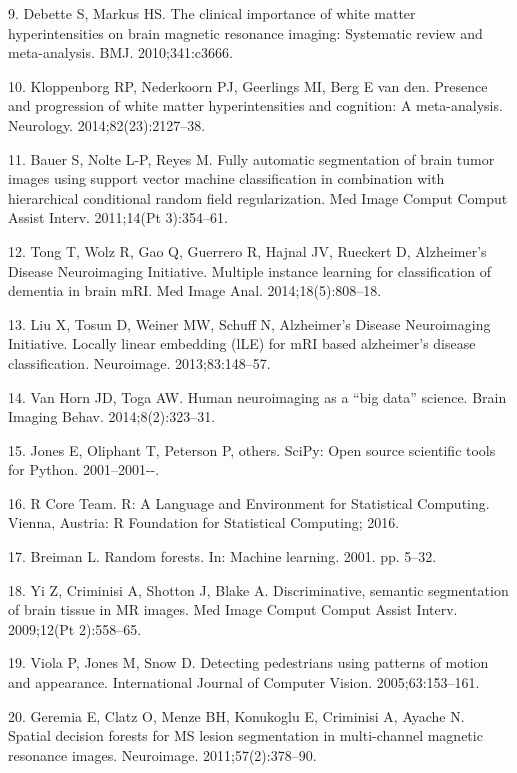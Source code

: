 \documentclass[11pt,]{article}
\begin{document}
\hypertarget{ref-Debette:2010aa}{}
9. Debette S, Markus HS. The clinical importance of white matter
hyperintensities on brain magnetic resonance imaging: Systematic review
and meta-analysis. BMJ. 2010;341:c3666.

\hypertarget{ref-Kloppenborg:2014aa}{}
10. Kloppenborg RP, Nederkoorn PJ, Geerlings MI, Berg E van den.
Presence and progression of white matter hyperintensities and cognition:
A meta-analysis. Neurology. 2014;82(23):2127--38.

\hypertarget{ref-Bauer:2011aa}{}
11. Bauer S, Nolte L-P, Reyes M. Fully automatic segmentation of brain
tumor images using support vector machine classification in combination
with hierarchical conditional random field regularization. Med Image
Comput Comput Assist Interv. 2011;14(Pt 3):354--61.

\hypertarget{ref-Tong:2014aa}{}
12. Tong T, Wolz R, Gao Q, Guerrero R, Hajnal JV, Rueckert D,
Alzheimer's Disease Neuroimaging Initiative. Multiple instance learning
for classification of dementia in brain mRI. Med Image Anal.
2014;18(5):808--18.

\hypertarget{ref-Liu:2013aa}{}
13. Liu X, Tosun D, Weiner MW, Schuff N, Alzheimer's Disease
Neuroimaging Initiative. Locally linear embedding (lLE) for mRI based
alzheimer's disease classification. Neuroimage. 2013;83:148--57.

\hypertarget{ref-Van-Horn:2014aa}{}
14. Van Horn JD, Toga AW. Human neuroimaging as a ``big data'' science.
Brain Imaging Behav. 2014;8(2):323--31.

\hypertarget{ref-scipy}{}
15. Jones E, Oliphant T, Peterson P, others. SciPy: Open source
scientific tools for Python. 2001--2001-\/-.

\hypertarget{ref-R}{}
16. R Core Team. R: A Language and Environment for Statistical
Computing. Vienna, Austria: R Foundation for Statistical Computing;
2016.

\hypertarget{ref-breiman2001}{}
17. Breiman L. Random forests. In: Machine learning. 2001. pp. 5--32.

\hypertarget{ref-yi2009}{}
18. Yi Z, Criminisi A, Shotton J, Blake A. Discriminative, semantic
segmentation of brain tissue in MR images. Med Image Comput Comput
Assist Interv. 2009;12(Pt 2):558--65.

\hypertarget{ref-viola2005}{}
19. Viola P, Jones M, Snow D. Detecting pedestrians using patterns of
motion and appearance. International Journal of Computer Vision.
2005;63:153--161.

\hypertarget{ref-geremia2011}{}
20. Geremia E, Clatz O, Menze BH, Konukoglu E, Criminisi A, Ayache N.
Spatial decision forests for MS lesion segmentation in multi-channel
magnetic resonance images. Neuroimage. 2011;57(2):378--90.
\end{document}
